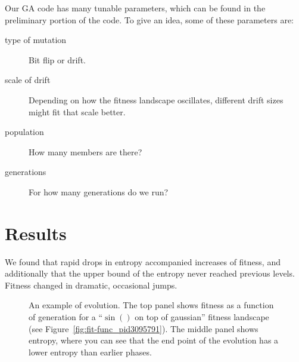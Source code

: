 \documentclass[11pt]{article}
\begin{document}
Our GA code has many tunable parameters, which can be found in the
preliminary portion of the code.  To give an idea, some of these
parameters are:

\begin{description}
\item [type of mutation] Bit flip or drift.
\item [scale of drift] Depending on how the fitness landscape
  oscillates, different drift sizes might fit that scale better.
\item [population] How many members are there?
\item [generations] For how many generations do we run?
\end{description}


\section{Results}
\label{sec:orged0917a}

We found that rapid drops in entropy accompanied increases of fitness,
and additionally that the upper bound of the entropy never reached
previous levels.  Fitness changed in dramatic, occasional jumps.

\begin{figure}[h]
  \centering
  \caption{An example of evolution.  The top panel shows fitness as a
    function of generation for a ``$\sin()$ on top of gaussian''
    fitness landscape (see Figure~\ref{fig:fit-func_pid3095791}).  The
    middle panel shows entropy, where you can see that the end point
    of the evolution has a lower entropy than earlier phases.}
  \label{fig:gen-info_pid3095791}
\end{figure}
\end{document}
